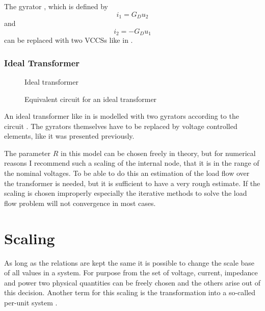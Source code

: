 The gyrator , which is defined by
\begin{equation}
	i_1 = G_D u_2
\end{equation}
and
\begin{equation}
	i_2 = -G_D u_1
\end{equation}
can be replaced with two VCCSs like in .

\subsubsection{Ideal Transformer}

\begin{figure}
	\centering
	
	\caption{Ideal transformer}
	\label{fig:ideal_transformer_original}
\end{figure}

\begin{figure}
	\centering
	
	\caption{Equivalent circuit for an ideal transformer}
	\label{fig:ideal_transformer_equivalent}
\end{figure}

An ideal transformer like in  is modelled with two gyrators according to the circuit . The gyrators themselves have to be replaced by voltage controlled elements, like it was presented previously.

The parameter $R$ in this model can be chosen freely in theory, but for numerical reasons I recommend such a scaling of the internal node, that it is in the range of the nominal voltages. To be able to do this an estimation of the load flow over the transformer is needed, but it is sufficient to have a very rough estimate. If the scaling is chosen improperly especially the iterative methods to solve the load flow problem will not convergence in most cases.

\section{Scaling}
As long as the relations are kept the same it is possible to change the scale base of all values in a system. For purpose from the set of voltage, current, impedance and power two physical quantities can be freely chosen and the others arise out of this decision. Another term for this scaling is the transformation into a so-called per-unit system \citep[p. 90]{powerSystemAnalysis}.

